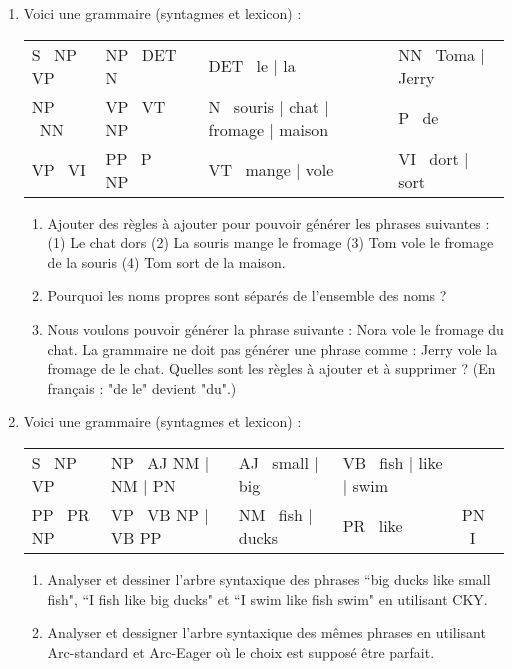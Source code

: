 \documentclass{KodeBook}
\begin{document}
\begin{enumerate}
	\item Voici une grammaire (syntagmes et lexicon) : 
	
	\begin{tabular}{|lllll|}
		\hline
		S \textrightarrow\ NP VP & NP \textrightarrow\ DET N && DET \textrightarrow\ le | la & NN \textrightarrow\ Toma | Jerry \\
		NP \textrightarrow\ NN & VP \textrightarrow\ VT NP &&  N \textrightarrow\  souris | chat | fromage | maison & P \textrightarrow\ de\\
		VP \textrightarrow\ VI & PP \textrightarrow\ P NP && VT \textrightarrow\ mange | vole & VI \textrightarrow\ dort | sort\\
		\hline
	\end{tabular}
	
	\begin{enumerate}
		\item Ajouter des règles à ajouter pour pouvoir générer les phrases suivantes : (1) Le chat dors (2) La souris mange le fromage (3) Tom vole le fromage de la souris (4) Tom sort de la maison.
		\item Pourquoi les noms propres sont séparés de l'ensemble des noms ?
		\item Nous voulons pouvoir générer la phrase suivante : Nora vole le fromage du chat. 
		La grammaire ne doit pas générer une phrase comme : Jerry vole la fromage de le chat. 
		Quelles sont les règles à ajouter et à supprimer ? (En français : "de le" devient "du".)
	\end{enumerate}

	\item Voici une grammaire (syntagmes et lexicon) : 
	
	\begin{tabular}{|lllll|}
		\hline
		S \textrightarrow\ NP VP & NP \textrightarrow\ AJ NM | NM | PN & AJ \textrightarrow\ small | big  & VB \textrightarrow\ fish | like | swim &  \\
		PP \textrightarrow\ PR NP & VP \textrightarrow\ VB NP | VB PP & NM \textrightarrow\ fish | ducks & PR \textrightarrow\ like & PN \textrightarrow\ I \\
		\hline
	\end{tabular}
	
	\begin{enumerate}
		\item Analyser et dessiner l'arbre syntaxique des phrases ``big ducks like small fish", ``I fish like big ducks" et ``I swim like fish swim" en utilisant CKY.
		\item Analyser et dessigner l'arbre syntaxique des mêmes phrases en utilisant Arc-standard et Arc-Eager où le choix est supposé être parfait.
	\end{enumerate}


\end{enumerate}
\end{document}
